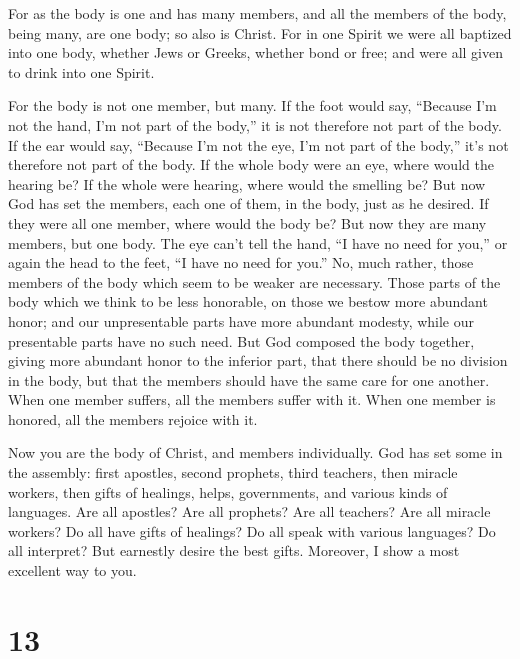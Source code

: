  For as the body is one and has many members, and all the
members of the body, being many, are one body; so also is Christ.
 For in one Spirit we were all baptized into one body,
whether Jews or Greeks, whether bond or free; and were all given to
drink into one Spirit.

 For the body is not one member, but many.
 If the foot would say, ``Because I'm not the hand, I'm
not part of the body,'' it is not therefore not part of the body.
 If the ear would say, ``Because I'm not the eye, I'm not
part of the body,'' it's not therefore not part of the body.
 If the whole body were an eye, where would the hearing
be? If the whole were hearing, where would the smelling be?
 But now God has set the members, each one of them, in
the body, just as he desired.  If they were all one
member, where would the body be?  But now they are many
members, but one body.  The eye can't tell the hand, ``I
have no need for you,'' or again the head to the feet, ``I have no need
for you.''  No, much rather, those members of the body
which seem to be weaker are necessary.  Those parts of
the body which we think to be less honorable, on those we bestow more
abundant honor; and our unpresentable parts have more abundant modesty,
 while our presentable parts have no such need. But God
composed the body together, giving more abundant honor to the inferior
part,  that there should be no division in the body, but
that the members should have the same care for one another.
 When one member suffers, all the members suffer with it.
When one member is honored, all the members rejoice with it.

 Now you are the body of Christ, and members
individually.  God has set some in the assembly: first
apostles, second prophets, third teachers, then miracle workers, then
gifts of healings, helps, governments, and various kinds of languages.
 Are all apostles? Are all prophets? Are all teachers?
Are all miracle workers?  Do all have gifts of healings?
Do all speak with various languages? Do all interpret? 
But earnestly desire the best gifts. Moreover, I show a most excellent
way to you.

\hypertarget{section-12}{%
\section{13}\label{section-12}}

